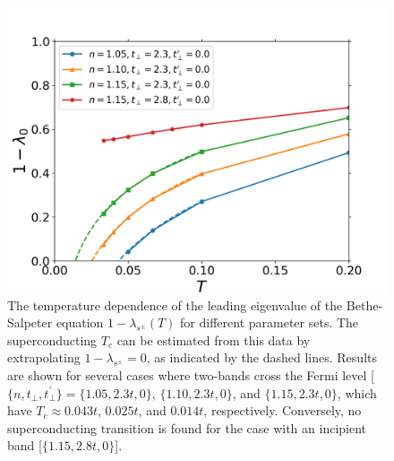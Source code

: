 \documentclass[prb,twocolumn,amsmath,amssymb,superscriptaddress,floatfix,nofootinbib]{revtex4-2}
\begin{document}
\begin{figure}[t]
\centering
\includegraphics[scale=0.4]{Temp_L0_varydensity.png}
\caption{The temperature dependence of the leading eigenvalue of the Bethe-Salpeter equation $1-\lambda_{s^\pm}(T)$ for different parameter sets. The superconducting $T_c$ can be estimated from this data by extrapolating $1-\lambda_{s^\pm} = 0$, as indicated by the dashed lines. Results are shown for several cases where two-bands cross the Fermi level [$\{ n, t_\perp, t_\perp^\prime \} = \{1.05, 2.3t, 0\}$, $\{1.10, 2.3t, 0\}$, and $\{1.15, 2.3t, 0\}$, which have $T_c \approx 0.043t$, $0.025t$, and $0.014t$, respectively. Conversely, no superconducting transition is found for the case with an incipient band [$\{1.15, 2.8t, 0\}$].}
\label{fig:lambdabulkinc}
\end{figure}
\end{document}
